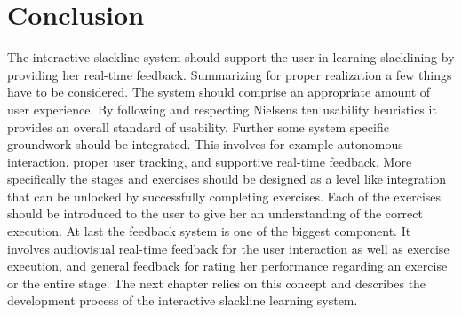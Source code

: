 \section{Conclusion}\label{4_7_conclusion}
The interactive slackline system should support the user in learning slacklining by providing her real-time feedback. Summarizing for proper realization a few things have to be considered. The system should comprise an appropriate amount of user experience. By following and respecting Nielsens ten usability heuristics it provides an overall standard of usability. Further some system specific groundwork should be integrated. This involves for example autonomous interaction, proper user tracking, and supportive real-time feedback. More specifically the stages and exercises should be designed as a level like integration that can be unlocked by successfully completing exercises. Each of the exercises should be introduced to the user to give her an understanding of the correct execution. At last the feedback system is one of the biggest component. It involves audiovisual real-time feedback for the user interaction as well as exercise execution, and general feedback for rating her performance regarding an exercise or the entire stage. The next chapter \textit{} relies on this concept and describes the development process of the interactive slackline learning system.

